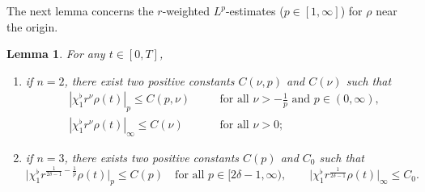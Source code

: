 \documentclass[11pt,reqno]{amsart}
\newtheorem{lem}{Lemma}[section]
\numberwithin{rk}{section}
\numberwithin{prop}{section}
\numberwithin{mydef}{section}
\numberwithin{lem}{section}
\numberwithin{equation}{section}
\numberwithin{thm}{section}
\begin{document}
The next lemma concerns the $r$-weighted $L^p$-estimates ($p\in[1,\infty]$) for $\rho$ near the origin.
\begin{lem}\label{l4.3}
For any $t\in[0,T]$,
\begin{enumerate}
\item[$\mathrm{(i)}$] if $n=2$, there exist two positive constants $C(\nu,p)$ and $C(\nu)$ such that 
\begin{equation*}
\begin{aligned}
&|\chi_1^\flat r^{\nu}\rho(t)|_p\leq C(p,\nu) &&\quad\text{for all $\nu>-\frac{1}{p}$ and $p\in (0,\infty)$},\\
&|\chi_1^\flat r^{\nu}\rho(t)|_\infty\leq C(\nu)&&\quad\text{for all $\nu>0$};
\end{aligned}
\end{equation*}
\item[$\mathrm{(ii)}$] if $n=3$, there exists two positive constants $C(p)$ and $C_0$ such that
\begin{equation*}
\big|\chi_1^\flat r^{\frac{1}{2\delta-1}-\frac{1}{p}}\rho(t)\big|_p \leq C(p)\quad\text{for all $p\in[2\delta-1,\infty)$},\qquad\big|\chi_1^\flat r^{\frac{1}{2\delta-1}}\rho(t)\big|_\infty \leq C_0.
\end{equation*}
\end{enumerate}
\end{lem}
\end{document}
